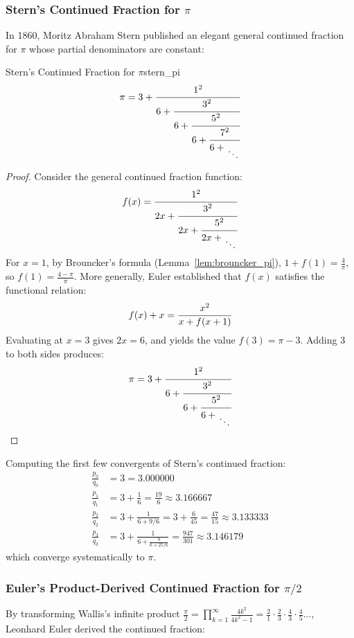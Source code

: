 \documentclass[a4paper]{article}
\begin{document}
\subsubsection{Stern's Continued Fraction for \texorpdfstring{$\pi$}{pi}}
In 1860, Moritz Abraham Stern published an elegant general continued fraction for $\pi$ whose partial denominators are constant:

\begin{mylemma}{Stern's Continued Fraction for \texorpdfstring{$\pi$}{pi}}{stern_pi}
  \[
    \pi = 3 + \cfrac{1^2}{6 + \cfrac{3^2}{6 + \cfrac{5^2}{6 + \cfrac{7^2}{6 + \CFDots}}}}
  \]

  \begin{proof}
    Consider the general continued fraction function:
    \[
      f(x) = \cfrac{1^2}{2x + \cfrac{3^2}{2x + \cfrac{5^2}{2x + \CFDots}}}
    \]
    For $x = 1$, by Brouncker's formula (Lemma~\ref{lem:brouncker_pi}), $1 + f(1) = \frac{4}{\pi}$, so $f(1) = \frac{4-\pi}{\pi}$.
    More generally, Euler established that $f(x)$ satisfies the functional relation:
    \[
      f(x) + x = \cfrac{x^2}{x + f(x+1)}
    \]
    Evaluating at $x = 3$ gives $2x = 6$, and yields the value $f(3) = \pi - 3$.
    Adding $3$ to both sides produces:
    \[
      \pi = 3 + \cfrac{1^2}{6 + \cfrac{3^2}{6 + \cfrac{5^2}{6 + \CFDots}}}
    \]
  \end{proof}
\end{mylemma}

Computing the first few convergents of Stern's continued fraction:
\begin{align*}
  \frac{p_0}{q_0} & = 3 = 3.000000 \\
  \frac{p_1}{q_1} & = 3 + \frac{1}{6} = \frac{19}{6} \approx 3.166667 \\
  \frac{p_2}{q_2} & = 3 + \frac{1}{6 + 9/6} = 3 + \frac{6}{45} = \frac{47}{15} \approx 3.133333 \\
  \frac{p_3}{q_3} & = 3 + \frac{1}{6 + \frac{9}{6 + 25/6}} = \frac{947}{301} \approx 3.146179
\end{align*}
which converge systematically to $\pi$.

\subsubsection{Euler's Product-Derived Continued Fraction for \texorpdfstring{$\pi/2$}{pi/2}}
By transforming Wallis's infinite product $\frac{\pi}{2} = \prod_{k=1}^\infty \frac{4k^2}{4k^2-1} = \frac{2}{1} \cdot \frac{2}{3} \cdot \frac{4}{3} \cdot \frac{4}{5} \dots$, Leonhard Euler derived the continued fraction:
\end{document}
